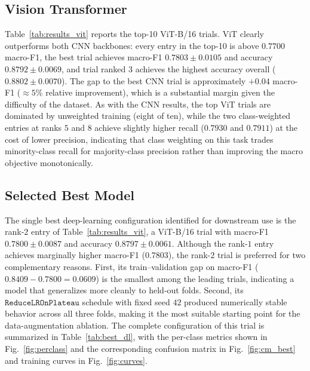 \documentclass[conference]{IEEEtran}
\begin{document}


\subsection{Vision Transformer}
Table~\ref{tab:results_vit} reports the top-10 ViT-B/16 trials. ViT clearly outperforms both CNN backbones: every entry in the top-10 is above $0.7700$ macro-F1, the best trial achieves macro-F1 $0.7803 \pm 0.0105$ and accuracy $0.8792 \pm 0.0069$, and trial ranked $3$ achieves the highest accuracy overall ($0.8802 \pm 0.0070$). The gap to the best CNN trial is approximately $+0.04$ macro-F1 ($\approx 5\%$ relative improvement), which is a substantial margin given the difficulty of the dataset. As with the CNN results, the top ViT trials are dominated by unweighted training (eight of ten), while the two class-weighted entries at ranks $5$ and $8$ achieve slightly higher recall ($0.7930$ and $0.7911$) at the cost of lower precision, indicating that class weighting on this task trades minority-class recall for majority-class precision rather than improving the macro objective monotonically.



\subsection{Selected Best Model}
\label{ssec:best}
The single best deep-learning configuration identified for downstream use is the rank-$2$ entry of Table~\ref{tab:results_vit}, a ViT-B/16 trial with macro-F1 $0.7800 \pm 0.0087$ and accuracy $0.8797 \pm 0.0061$. Although the rank-$1$ entry achieves marginally higher macro-F1 ($0.7803$), the rank-$2$ trial is preferred for two complementary reasons. First, its train--validation gap on macro-F1 ($0.8409 - 0.7800 = 0.0609$) is the smallest among the leading trials, indicating a model that generalizes more cleanly to held-out folds. Second, its $\texttt{ReduceLROnPlateau}$ schedule with fixed seed $42$ produced numerically stable behavior across all three folds, making it the most suitable starting point for the data-augmentation ablation. The complete configuration of this trial is summarized in Table~\ref{tab:best_dl}, with the per-class metrics shown in Fig.~\ref{fig:perclass} and the corresponding confusion matrix in Fig.~\ref{fig:cm_best} and training curves in Fig.~\ref{fig:curves}.
\end{document}
